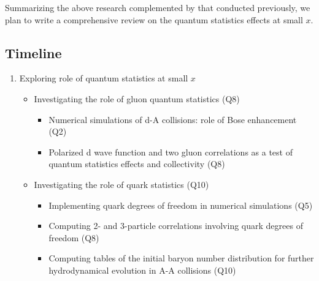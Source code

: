 		
		Summarizing the above research complemented by that conducted previously, 
		we plan to write a comprehensive review on the quantum statistics effects at small $x$. 


    \vspace{0.5em}
    \subsection{Timeline}
        \label{sec:p32}
        \begin{enumerate}
            \item Exploring role of quantum statistics at small $x$
                \begin{itemize}
                    \item Investigating the role of gluon quantum statistics (Q8)
                        \begin{itemize}
                            \item Numerical simulations of d-A collisions: role of Bose enhancement (Q2) 
                            \item Polarized d wave function and two gluon correlations as a test of quantum 
								statistics effects and collectivity (Q8) 
                        \end{itemize}
                    \item Investigating the role of quark statistics (Q10)
                        \begin{itemize}
                            \item Implementing quark degrees of freedom in numerical simulations (Q5)
                            \item Computing 2- and 3-particle correlations involving quark degrees of freedom (Q8)
                            \item Computing tables of the initial baryon number distribution for further hydrodynamical evolution in A-A collisions   (Q10)
                        \end{itemize}
                \end{itemize}
        \end{enumerate}


